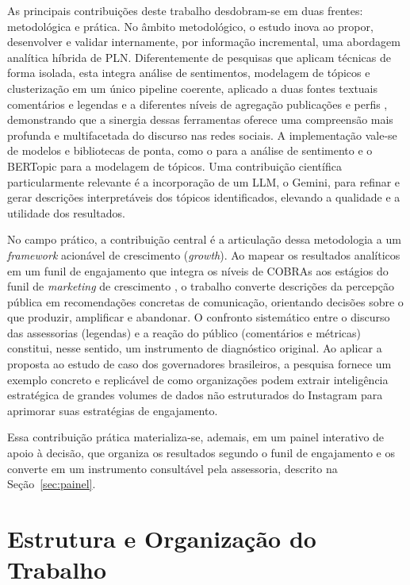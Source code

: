 As principais contribuições deste trabalho desdobram-se em duas frentes: metodológica e prática. No âmbito metodológico, o estudo inova ao propor, desenvolver e validar internamente, por informação incremental, uma abordagem analítica híbrida de PLN. Diferentemente de pesquisas que aplicam técnicas de forma isolada, esta integra análise de sentimentos, modelagem de tópicos e clusterização em um único pipeline coerente, aplicado a duas fontes textuais \textemdash{} comentários e legendas \textemdash{} e a diferentes níveis de agregação \textemdash{} publicações e perfis \textemdash{}, demonstrando que a sinergia dessas ferramentas oferece uma compreensão mais profunda e multifacetada do discurso nas redes sociais. A implementação vale-se de modelos e bibliotecas de ponta, como o  para a análise de sentimento e o BERTopic para a modelagem de tópicos. Uma contribuição científica particularmente relevante é a incorporação de um LLM, o Gemini, para refinar e gerar descrições interpretáveis dos tópicos identificados, elevando a qualidade e a utilidade dos resultados.

No campo prático, a contribuição central é a articulação dessa metodologia a um \emph{framework} acionável de crescimento (\emph{growth}). Ao mapear os resultados analíticos em um funil de engajamento \textemdash{} que integra os níveis de COBRAs \cite{muntinga2011} aos estágios do funil de \emph{marketing} de crescimento \cite{feroz2024} \textemdash{}, o trabalho converte descrições da percepção pública em recomendações concretas de comunicação, orientando decisões sobre o que produzir, amplificar e abandonar. O confronto sistemático entre o discurso das assessorias (legendas) e a reação do público (comentários e métricas) constitui, nesse sentido, um instrumento de diagnóstico original. Ao aplicar a proposta ao estudo de caso dos governadores brasileiros, a pesquisa fornece um exemplo concreto e replicável de como organizações podem extrair inteligência estratégica de grandes volumes de dados não estruturados do Instagram para aprimorar suas estratégias de engajamento.

Essa contribuição prática materializa-se, ademais, em um painel interativo de apoio à decisão, que organiza os resultados segundo o funil de engajamento e os converte em um instrumento consultável pela assessoria, descrito na Seção~\ref{sec:painel}.

\section{Estrutura e Organização do Trabalho}

